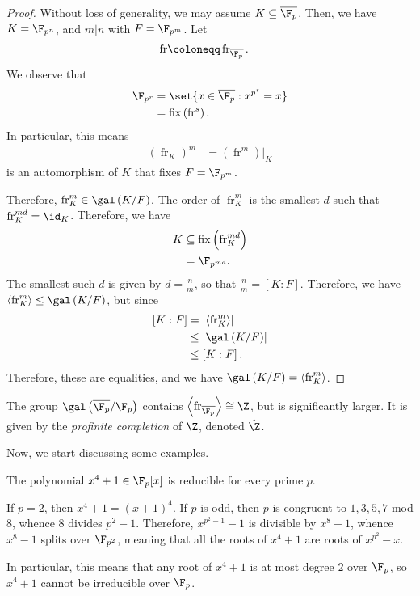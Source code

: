 \documentclass[10pt]{mypackage}
\renewcommand{\coloneq}{\coloneqq}
\begin{document}
\begin{proof}
  Without loss of generality, we may assume $K\subseteq \overline{\F_p}$. Then, we have $K = \F_{p^{n}}$, and $m | n$ with $F = \F_{p^{m}}$. Let
  \begin{align*}
    \operatorname{fr} &\coloneq \operatorname{fr}_{ \overline{\F_{p}} }.
  \end{align*}
  We observe that
  \begin{align*}
    \F_{p^{r}} &= \set{x\in \overline{\F_p} : x^{p^{s}} = x}\\
               &= \operatorname{fix}\left( \operatorname{fr}^s \right).
  \end{align*}
  In particular, this means
  \begin{align*}
    \left( \operatorname{fr}_{K} \right)^{m} &= \left( \operatorname{fr}^{m} \right)|_{K}
  \end{align*}
  is an automorphism of $K$ that fixes $F = \F_{p^{m}}$.

  Therefore, $\operatorname{fr}_{K}^{m} \in \gal\left( K/F \right)$. The order of $\operatorname{fr}_K^{m}$ is the smallest $d$ such that $\operatorname{fr}_{K}^{md} = \id_K$. Therefore, we have
  \begin{align*}
    K &\subseteq \operatorname{fix}\left( \operatorname{fr}_{K}^{md} \right)\\
      &= \F_{p^{md}}.
  \end{align*}
  The smallest such $d$ is given by $d = \frac{n}{m}$, so that $\frac{n}{m} = \left[ K:F \right]$. Therefore, we have $ \left\langle \operatorname{fr}_K^{m} \right\rangle\leq \gal\left( K/F \right) $, but since
  \begin{align*}
    \left[ K:F \right] &= \left\vert \left\langle \operatorname{fr}_K^{m} \right\rangle \right\vert\\
                       &\leq \left\vert \gal\left( K/F \right) \right\vert\\
                       &\leq \left[ K:F \right].
  \end{align*}
  Therefore, these are equalities, and we have $\gal\left( K/F \right) = \left\langle \operatorname{fr}_K^m \right\rangle$.
\end{proof}
\begin{remark}
  The group $\gal\left( \overline{\F_p}/\F_p \right)$ contains $ \left\langle \operatorname{fr}_{ \overline{\F_p} } \right\rangle \cong \Z $, but is significantly larger. It is given by the \textit{profinite completion} of $\Z$, denoted $\hat{\Z}$.
\end{remark}
Now, we start discussing some examples.
\begin{example}
  The polynomial $x^{4} + 1\in \F_p[x]$ is reducible for every prime $p$.

  If $p = 2$, then $x^{4} + 1 = \left( x + 1 \right)^{4}$. If $p$ is odd, then $p$ is congruent to $1,3,5,7$ mod $8$, whence $8$ divides $p^2 - 1$. Therefore, $x^{p^2-1}-1$ is divisible by $x^{8}-1$, whence $x^{8}-1$ splits over $\F_{p^2}$, meaning that all the roots of $x^{4} + 1$ are roots of $x^{p^2}-x$.

  In particular, this means that any root of $x^{4} + 1$ is at most degree $2$ over $\F_p$, so $x^4 + 1$ cannot be irreducible over $\F_p$.
\end{example}
\end{document}
